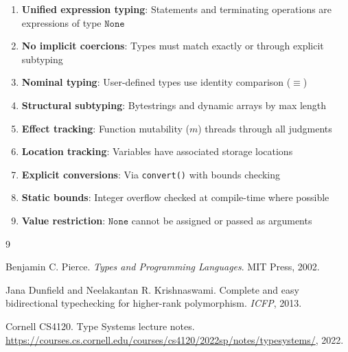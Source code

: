 \documentclass[11pt]{article}
\newcommand{\kw}[1]{\texttt{#1}}
\begin{document}
\begin{enumerate}
  \item \textbf{Unified expression typing}: Statements and terminating operations
        are expressions of type $\kw{None}$
  \item \textbf{No implicit coercions}: Types must match exactly or through explicit subtyping
  \item \textbf{Nominal typing}: User-defined types use identity comparison ($\equiv$)
  \item \textbf{Structural subtyping}: Bytestrings and dynamic arrays by max length
  \item \textbf{Effect tracking}: Function mutability ($m$) threads through all judgments
  \item \textbf{Location tracking}: Variables have associated storage locations
  \item \textbf{Explicit conversions}: Via \kw{convert()} with bounds checking
  \item \textbf{Static bounds}: Integer overflow checked at compile-time where possible
  \item \textbf{Value restriction}: $\kw{None}$ cannot be assigned or passed as arguments
\end{enumerate}

\begin{thebibliography}{9}

Benjamin C. Pierce.
\textit{Types and Programming Languages}.
MIT Press, 2002.

Jana Dunfield and Neelakantan R. Krishnaswami.
Complete and easy bidirectional typechecking for higher-rank polymorphism.
\textit{ICFP}, 2013.

Cornell CS4120.
Type Systems lecture notes.
\url{https://courses.cs.cornell.edu/courses/cs4120/2022sp/notes/typesystems/}, 2022.

\end{thebibliography}
\end{document}
